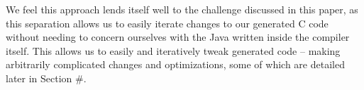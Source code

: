 We feel this approach lends itself well to the challenge discussed in this paper, as this separation allows us to easily iterate changes to our generated C code without needing to concern ourselves with the Java written inside the compiler itself. This allows us to easily and iteratively tweak generated code -- making arbitrarily complicated changes and optimizations, some of which are detailed later in Section \#.








